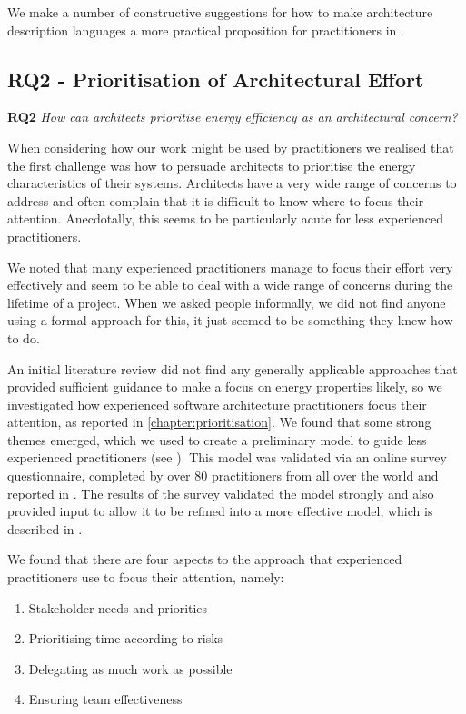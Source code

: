 We make a number of constructive suggestions for how to make architecture description languages a more practical proposition for practitioners in
 .

 \subsection{RQ2 - Prioritisation of Architectural Effort}

\textbf{RQ2} \emph{How can architects prioritise energy efficiency as an architectural concern?}

When considering how our work might be used by practitioners we realised that the first challenge was how to persuade architects to prioritise the energy characteristics of their systems.  Architects have a very wide range of concerns to address and often complain that it is difficult to know where to focus their attention.  Anecdotally, this seems to be particularly acute for less experienced practitioners.

We noted that many experienced practitioners manage to focus their effort very effectively and seem to be able to deal with a wide range of concerns during the lifetime of a project.  When we asked people informally, we did not find anyone using a formal approach for this, it just seemed to be something they knew how to do. 

An initial literature review did not find any generally applicable approaches that provided sufficient guidance to make a focus on energy properties likely, so we investigated how experienced software architecture practitioners focus their attention, as reported in  \cref{chapter:prioritisation}.  We found that some strong themes emerged, which we used to create a preliminary model to guide less experienced practitioners (see ).  This model was validated via an online survey questionnaire, completed by over 80 practitioners from all over the world and reported in .  The results of the survey validated the model strongly and also provided input to allow it to be refined into a more effective model, which is described in .

We found that there are four aspects to the approach that experienced practitioners use to focus their attention, namely:
\begin{enumerate}
	\item Stakeholder needs and priorities
	\item Prioritising time according to risks
	\item Delegating as much work as possible
	\item Ensuring team effectiveness
\end{enumerate}

